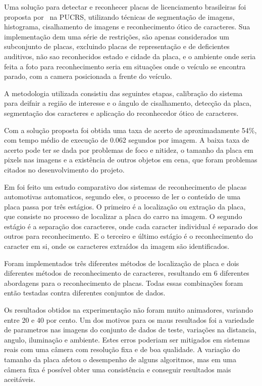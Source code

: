 
Uma solução para detectar e reconhecer placas de licenciamento brasileiras foi
proposta por~\cite{serro2012deteccao} na PUCRS, utilizando técnicas de
segmentação de imagens, histograma, cisalhamento de imagens e reconhecimento
ótico de caracteres. Sua implementação dem uma série de restrições, são apenas
considerados um subconjunto de placas, excluindo placas de representação e de
deficientes auditivos, não sao reconhecidos estado e cidade da placa, e o
ambiente onde seria feita a foto para reconhecimento seria em situações onde o
veículo se encontra parado, com a camera posicionada a frente do veículo.

A metodologia utilizada consistiu das seguintes etapas, calibração do sistema
para deifnir a região de interesse e o ângulo de cisalhamento, detecção da
placa, segmentação dos caracteres e aplicação do reconhecedor ótico de
caracteres.

Com a solução proposta foi obtida uma taxa de acerto de aproximadamente 54\%,
com tempo médio de execução de 0.062 segundos por imagem. A baixa taxa de acerto
pode ter se dada por problemas de foco e nitidez, o tamanho da placa em pixels
nas imagens e a existência de outros objetos em cena, que foram problemas
citados no desenvolvimento do projeto.

Em \cite{ahmad2015automatic} foi feito um estudo comparativo dos sistemas de
reconhecimento de placas automotivas automaticos, segundo eles, o processo de
ler o conteúdo de uma placa passa por três estágios. O primeiro é a localização
ou extração da placa, que consiste no processo de localizar a placa do carro na
imagem. O segundo estágio é a separação dos caracteres, onde cada caracter
individual é separado dos outros para reconhecimento. E o terceiro e último
estágio é o reconhecimento do caracter em si, onde os caracteres extraídos da
imagem são identificados.

Foram implementados três diferentes métodos de localização de placa e dois
diferentes métodos de reconhecimento de caracteres, resultando em 6 diferentes
abordagens para o reconhecimento de placas. Todas essas combinações foram então
testadas contra diferentes conjuntos de dados.

Os resultados obtidos na experimentação não foram muito animadores, variando
entre 20 e 40 por cento. Um dos motivos para os maus resultados foi a variedade
de parametros nas imagens do conjunto de dados de teste, variações na distancia,
angulo, iluminação e ambiente. Estes erros poderiam ser mitigados em sistemas
reais com uma câmera com resolução fixa e de boa qualidade. A variação do
tamanho da placa afetou o desempenho de alguns algoritmos, mas em uma câmera
fixa é possível obter uma consistência e conseguir resultados mais aceitáveis.

